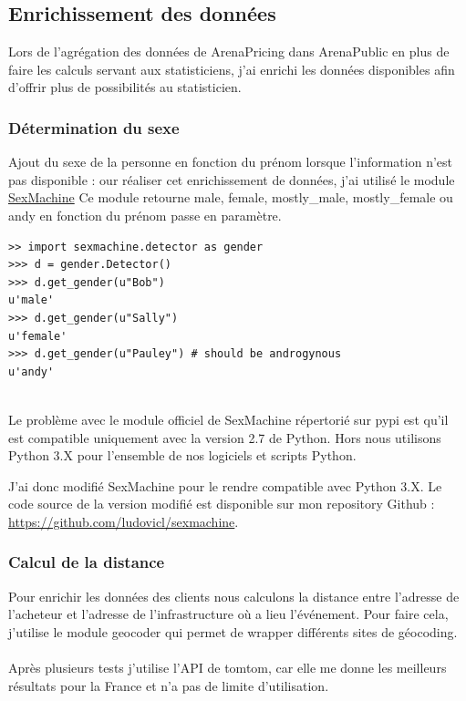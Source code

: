 \subsection{Enrichissement des données}
Lors de l'agrégation des données de ArenaPricing dans ArenaPublic en plus de faire les calculs servant aux statisticiens, j'ai enrichi les données disponibles afin d'offrir plus de possibilités au statisticien.
\subsubsection{Détermination du sexe}
Ajout du sexe de la personne en fonction du prénom lorsque l'information n'est pas disponible :
our réaliser cet enrichissement de données, j'ai utilisé le module 
\href{https://github.com/ferhatelmas/sexmachine/}{SexMachine}
Ce module retourne male, female, mostly\_male, mostly\_female ou andy en fonction du prénom passe en paramètre.

\lstset{style=custompython}
\begin{lstlisting}
>> import sexmachine.detector as gender
>>> d = gender.Detector()
>>> d.get_gender(u"Bob")
u'male'
>>> d.get_gender(u"Sally")
u'female'
>>> d.get_gender(u"Pauley") # should be androgynous
u'andy'
\end{lstlisting}
\leavevmode \\
Le problème avec le module officiel de SexMachine répertorié sur pypi est qu'il est compatible uniquement avec la version 2.7 de Python. Hors nous utilisons Python 3.X pour l'ensemble de nos logiciels et scripts Python. 

J'ai donc modifié SexMachine pour le rendre compatible avec Python 3.X. Le code source de la version modifié est disponible sur mon repository Github : \href{https://github.com/ludovicl/sexmachine}{https://github.com/ludovicl/sexmachine}.

\subsubsection{Calcul de la distance}

Pour enrichir les données des clients nous calculons la distance entre l'adresse de l'acheteur et l'adresse de l'infrastructure où a lieu l'événement.
Pour faire cela, j'utilise le module geocoder qui permet de wrapper différents sites de géocoding.
\\ \\
Après plusieurs tests j'utilise l'API de tomtom, car elle me donne les meilleurs résultats pour la France et n'a pas de limite d'utilisation.

